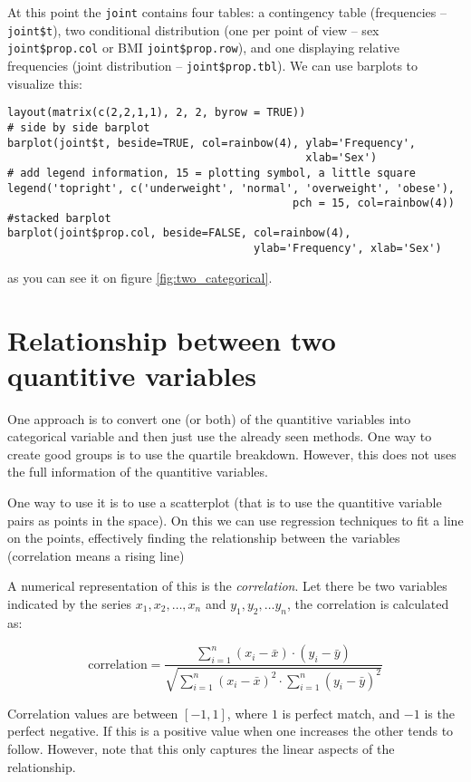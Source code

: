 At this point the \texttt{joint} contains four tables: a contingency table
(frequencies -- \texttt{joint\$t}), two conditional distribution (one per point
of view -- sex \texttt{joint\$prop.col} or BMI \texttt{joint\$prop.row}), and
one displaying relative frequencies (joint distribution --
\texttt{joint\$prop.tbl}). We can use barplots to visualize this:

\begin{verbatim}
layout(matrix(c(2,2,1,1), 2, 2, byrow = TRUE))
# side by side barplot
barplot(joint$t, beside=TRUE, col=rainbow(4), ylab='Frequency', 
                                              xlab='Sex')
# add legend information, 15 = plotting symbol, a little square
legend('topright', c('underweight', 'normal', 'overweight', 'obese'), 
                                            pch = 15, col=rainbow(4))
#stacked barplot
barplot(joint$prop.col, beside=FALSE, col=rainbow(4), 
                                      ylab='Frequency', xlab='Sex')
\end{verbatim}

as you can see it on figure \ref{fig:two_categorical}.

\section{Relationship between two quantitive variables}

One approach is to convert one (or both) of the quantitive variables into
categorical variable and then just use the already seen methods. One way to
create good groups is to use the quartile breakdown. However, this does not uses
the full information of the quantitive variables. 

One way to use it is to use a scatterplot (that is to use the quantitive
variable pairs as points in the space). On this we can use regression techniques
to fit a line on the points, effectively finding the relationship between the
variables (correlation means a rising line)

A numerical representation of this is the \emph{correlation}. Let there be two
variables indicated by the series $x_1, x_2, \ldots, x_n$ and $y_1, y_2, \ldots
y_n$, the correlation is calculated as:

\[ \mbox{correlation} = \frac{\sum_{i=1}^{n}\left( x_i-\bar{x}\right) \cdot
\left( y_i - \bar{y}\right)}{\sqrt{\sum_{i=1}^{n}\left( x_i-\bar{x}\right)^2
\cdot \sum_{i=1}^{n}\left( y_i - \bar{y}\right)^2}}
\]

Correlation values are between $[-1, 1]$, where $1$ is perfect match, and $-1$
is the perfect negative. If this is a positive value when one increases the
other tends to follow. However, note that this only captures the linear aspects
of the relationship.

